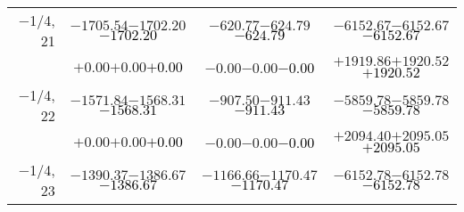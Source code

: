 \documentclass[compress]{beamer}
\begin{document}
\begin{frame}
{\begin{tabular}{r | c | c | c}
$-$1/4, 21 & $-1705.54$\hspace{0.1 cm}$-1702.20$\hspace{0.1 cm}\textcolor{black}{$-1702.20$} & $-620.77$\hspace{0.1 cm}$-624.79$\hspace{0.1 cm}\textcolor{black}{$-624.79$} & $-6152.67$\hspace{0.1 cm}$-6152.67$\hspace{0.1 cm}\textcolor{black}{$-6152.67$} \\
           & $+0.00$\hspace{0.1 cm}$+0.00$\hspace{0.1 cm}\textcolor{black}{$+0.00$} & $-0.00$\hspace{0.1 cm}$-0.00$\hspace{0.1 cm}\textcolor{black}{$-0.00$} & $+1919.86$\hspace{0.1 cm}$+1920.52$\hspace{0.1 cm}\textcolor{black}{$+1920.52$} \\
$-$1/4, 22 & $-1571.84$\hspace{0.1 cm}$-1568.31$\hspace{0.1 cm}\textcolor{black}{$-1568.31$} & $-907.50$\hspace{0.1 cm}$-911.43$\hspace{0.1 cm}\textcolor{black}{$-911.43$} & $-5859.78$\hspace{0.1 cm}$-5859.78$\hspace{0.1 cm}\textcolor{black}{$-5859.78$} \\
           & $+0.00$\hspace{0.1 cm}$+0.00$\hspace{0.1 cm}\textcolor{black}{$+0.00$} & $-0.00$\hspace{0.1 cm}$-0.00$\hspace{0.1 cm}\textcolor{black}{$-0.00$} & $+2094.40$\hspace{0.1 cm}$+2095.05$\hspace{0.1 cm}\textcolor{black}{$+2095.05$} \\
$-$1/4, 23 & $-1390.37$\hspace{0.1 cm}$-1386.67$\hspace{0.1 cm}\textcolor{black}{$-1386.67$} & $-1166.66$\hspace{0.1 cm}$-1170.47$\hspace{0.1 cm}\textcolor{black}{$-1170.47$} & $-6152.78$\hspace{0.1 cm}$-6152.78$\hspace{0.1 cm}\textcolor{black}{$-6152.78$} \\

\end{tabular}}
\end{frame}
\end{document}
